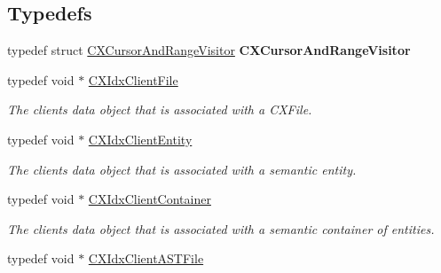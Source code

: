 \subsection*{Typedefs}
\begin{DoxyCompactItemize}
\item 
\mbox{\label{group__CINDEX__HIGH_ga72188fec58b54e655adf195c93118162}} 
typedef struct \mbox{\hyperlink{structCXCursorAndRangeVisitor}{C\+X\+Cursor\+And\+Range\+Visitor}} {\bfseries C\+X\+Cursor\+And\+Range\+Visitor}
\item 
\mbox{\label{group__CINDEX__HIGH_ga6fd9c59c0b0a0a21622e5bcfc08156cc}} 
typedef void $\ast$ \mbox{\hyperlink{group__CINDEX__HIGH_ga6fd9c59c0b0a0a21622e5bcfc08156cc}{C\+X\+Idx\+Client\+File}}
\begin{DoxyCompactList}\small\item\em The client\textquotesingle{}s data object that is associated with a C\+X\+File. \end{DoxyCompactList}\item 
\mbox{\label{group__CINDEX__HIGH_gaaa7374e63b63b3d14af7cf87af386955}} 
typedef void $\ast$ \mbox{\hyperlink{group__CINDEX__HIGH_gaaa7374e63b63b3d14af7cf87af386955}{C\+X\+Idx\+Client\+Entity}}
\begin{DoxyCompactList}\small\item\em The client\textquotesingle{}s data object that is associated with a semantic entity. \end{DoxyCompactList}\item 
\mbox{\label{group__CINDEX__HIGH_ga0dac2cb977094bbd9d13b9d8abed278f}} 
typedef void $\ast$ \mbox{\hyperlink{group__CINDEX__HIGH_ga0dac2cb977094bbd9d13b9d8abed278f}{C\+X\+Idx\+Client\+Container}}
\begin{DoxyCompactList}\small\item\em The client\textquotesingle{}s data object that is associated with a semantic container of entities. \end{DoxyCompactList}\item 
\mbox{\label{group__CINDEX__HIGH_ga802a69b3db636a25c5d434585fce9cbd}} 
typedef void $\ast$ \mbox{\hyperlink{group__CINDEX__HIGH_ga802a69b3db636a25c5d434585fce9cbd}{C\+X\+Idx\+Client\+A\+S\+T\+File}}

\end{DoxyCompactItemize}
